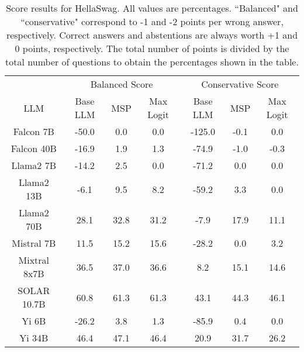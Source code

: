 \begin{table*}
\centering
\begin{tabular}{c|c|c|c|c|c|c}
& \multicolumn{3}{c|}{Balanced Score} & \multicolumn{3}{c}{Conservative Score} \\ 
LLM & Base LLM & MSP & Max Logit & Base LLM & MSP & Max Logit\\ \hline
Falcon 7B & -50.0 & 0.0 & 0.0 & -125.0 & -0.1 & 0.0\\
Falcon 40B & -16.9 & 1.9 & 1.3 & -74.9 & -1.0 & -0.3\\
Llama2 7B & -14.2 & 2.5 & 0.0 & -71.2 & 0.0 & 0.0\\
Llama2 13B & -6.1 & 9.5 & 8.2 & -59.2 & 3.3 & 0.0\\
Llama2 70B & 28.1 & 32.8 & 31.2 & -7.9 & 17.9 & 11.1\\
Mistral 7B & 11.5 & 15.2 & 15.6 & -28.2 & 0.0 & 3.2\\
Mixtral 8x7B & 36.5 & 37.0 & 36.6 & 8.2 & 15.1 & 14.6\\
SOLAR 10.7B & 60.8 & 61.3 & 61.3 & 43.1 & 44.3 & 46.1\\
Yi 6B & -26.2 & 3.8 & 1.3 & -85.9 & 0.4 & 0.0\\
Yi 34B & 46.4 & 47.1 & 46.4 & 20.9 & 31.7 & 26.2\\
\hline
\end{tabular}
\caption{Score results for HellaSwag. All values are percentages. ``Balanced" and ``conservative" correspond to -1 and -2 points per wrong answer, respectively. Correct answers and abstentions are always worth +1 and 0 points, respectively. The total number of points is divided by the total number of questions to obtain the percentages shown in the table.}
\label{tab:hellaswag_score}
\end{table*}
